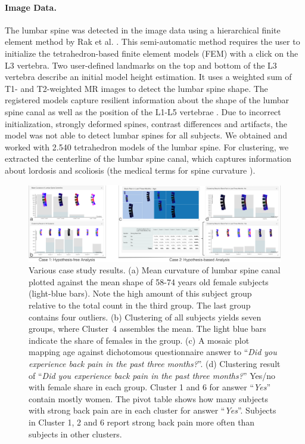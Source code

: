\documentclass[journal]{style/vgtc} 			          %
\begin{document}
\paragraph{Image Data.} \label{Image-Data}
The lumbar spine was detected in the image data using a hierarchical finite element method by Rak et al. \cite{Rak2013}.
%
This semi-automatic method requires the user to initialize the tetrahedron-based finite element models (FEM) with a click on the L3 vertebra.
%
Two user-defined landmarks on the top and bottom of the L3 vertebra describe an initial model height estimation.
%
It uses a weighted sum of T1- and T2-weighted MR images to detect the lumbar spine shape.
%
The registered models capture resilient information about the shape of the lumbar spine canal as well as the position of the L1-L5 vertebrae \cite{Klemm2013VMV}.
%
Due to incorrect initialization, strongly deformed spines, contrast differences and artifacts, the model was not able to detect lumbar spines for all subjects.
%
We obtained and worked with 2.540 tetrahedron models of the lumbar spine.
%
For clustering, we extracted the centerline of the lumbar spine canal, which captures information about lordosis and scoliosis (the medical terms for spine curvature \cite{Klemm2013VMV}).

\begin{figure}[htb]
 \centering
 \includegraphics[width=1\textwidth, resolution=300]{figures/evaluation}
 \caption{Various case study results.
 (a) Mean curvature of lumbar spine canal plotted against the mean shape of 58-74 years old female subjects (light-blue bars).
 Note the high amount of this subject group relative to the total count in the third group. The last group contains four outliers.
 (b) Clustering of all subjects yields seven groups, where Cluster~4 assembles the mean. The light blue bars indicate the share of females in the group.
 (c) A mosaic plot mapping age against dichotomous questionnaire answer to ``\emph{Did you experience back pain in the past three months?}''.
 (d) Clustering result of ``\emph{Did you experience back pain in the past three months?}'' Yes/no with female share in each group. 
 Cluster 1 and 6 for answer ``\emph{Yes}'' contain mostly women.
 The pivot table shows how many subjects with strong back pain are in each cluster for answer ``\emph{Yes}''.
 Subjects in Cluster 1, 2 and 6 report strong back pain more often than subjects in other clusters.
 }
 \label{fig:application}
\end{figure}
\end{document}
